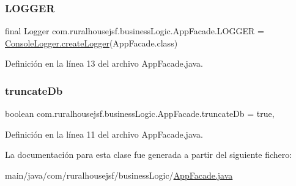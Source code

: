 \mbox{\label{a00128_a05d4beab693581eccd0ba740dc222f37}} 
\subsubsection{\texorpdfstring{LOGGER}{LOGGER}}
{\footnotesize\ttfamily final Logger com.\+ruralhousejsf.\+business\+Logic.\+App\+Facade.\+L\+O\+G\+G\+ER = \mbox{\hyperlink{a00220_a520321643663e37d95761134a35505cd}{Console\+Logger.\+create\+Logger}}(App\+Facade.\+class)\hspace{0.3cm}{\ttfamily [static]}}



Definición en la línea 13 del archivo App\+Facade.\+java.

\mbox{\label{a00128_ac9cbe77035be5cc1f9bf258c57ca6564}} 
\subsubsection{\texorpdfstring{truncateDb}{truncateDb}}
{\footnotesize\ttfamily boolean com.\+ruralhousejsf.\+business\+Logic.\+App\+Facade.\+truncate\+Db = true\hspace{0.3cm}{\ttfamily [static]}, {\ttfamily [private]}}



Definición en la línea 11 del archivo App\+Facade.\+java.



La documentación para esta clase fue generada a partir del siguiente fichero\+:\begin{DoxyCompactItemize}
\item 
main/java/com/ruralhousejsf/business\+Logic/\mbox{\hyperlink{a00002}{App\+Facade.\+java}}\end{DoxyCompactItemize}
